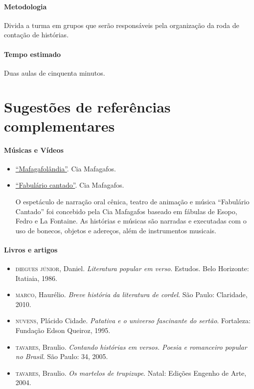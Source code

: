\documentclass[11pt]{extarticle}
\begin{document}
\paragraph{Metodologia} Divida a turma em grupos que serão 
responsáveis pela organização da roda de contação de histórias. 


\paragraph{Tempo estimado} Duas aulas de cinquenta minutos.


\section{Sugestões de referências complementares}

\paragraph{Músicas e Vídeos}

\begin{itemize}
\item \href{https://www.youtube.com/watch?v=MYZm-aR2IJU}{``Mafagafolândia''}. Cia Mafagafos. 


\item \href{https://www.youtube.com/watch?v=0tWcd7Xvbbs}{``Fabulário cantado''}. Cia Mafagafos. 

O espetáculo de narração oral cênica, teatro de animação e música ``Fabulário Cantado'' foi concebido pela Cia Mafagafos baseado em fábulas de Esopo, Fedro e La Fontaine.  As histórias e músicas são narradas e executadas com o uso de bonecos, objetos e adereços, além de instrumentos musicais. 


\end{itemize}


\paragraph{Livros e artigos}

\begin{itemize}
	
\item \textsc{diegues júnior}, Daniel. \textit{Literatura popular em verso}. Estudos. Belo Horizonte: Itatiaia, 1986. 

\item \textsc{marco}, Haurélio. \textit{Breve história da literatura de cordel}. São Paulo: Claridade, 2010.

\item \textsc{nuvens}, Plácido Cidade. \textit{Patativa e o universo fascinante
do sertão}. Fortaleza: Fundação Edson Queiroz, 1995.

\item \textsc{tavares}, Braulio. \textit{Contando histórias em versos. Poesia e romanceiro popular no Brasil}. São Paulo: 34, 2005.

\item \textsc{tavares}, Braulio. \textit{Os martelos de trupizupe}. Natal: Edições Engenho de Arte, 2004.
\end{itemize}
\end{document}
